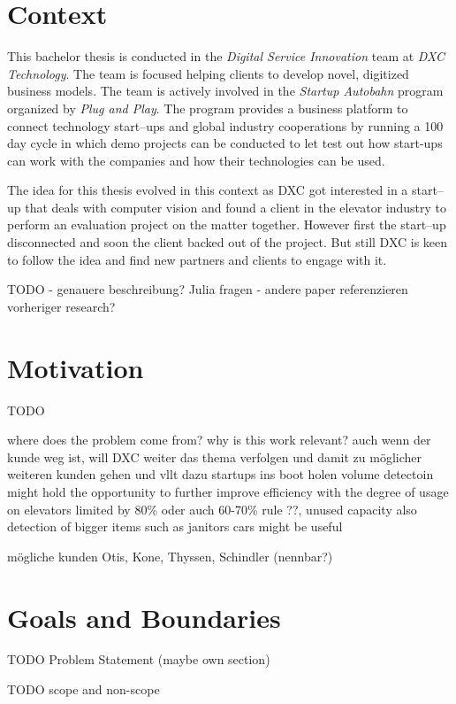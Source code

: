 \section{Context}

This bachelor thesis is conducted in the \emph{Digital Service Innovation} team at \emph{DXC Technology}.
The team is focused helping clients to develop novel, digitized business models.
The team is actively involved in the \emph{Startup Autobahn} program organized by \emph{Plug and Play}.
The program provides a business platform to connect technology start--ups and global industry cooperations 
by running a 100 day cycle in which demo projects can be conducted to let test out how start-ups can work with the companies and how their technologies can be used.

The idea for this thesis evolved in this context as DXC got interested in a start--up that deals with computer vision and found a client in the elevator industry to perform an evaluation project on the matter together.
However first the start--up disconnected and soon the client backed out of the project.
But still DXC is keen to follow the idea and find new partners and clients to engage with it.


TODO
- genauere beschreibung? Julia fragen
- andere paper referenzieren vorheriger research?


\section{Motivation}


TODO


where does the problem come from?
why is this work relevant?
auch wenn der kunde weg ist, will DXC weiter das thema verfolgen und damit zu möglicher weiteren kunden gehen und vllt dazu startups ins boot holen
volume detectoin might hold the opportunity to further improve efficiency with the degree of usage on elevators
limited by 80\% oder auch 60-70\% rule ??, unused capacity
also detection of bigger items such as janitors cars might be useful


mögliche kunden Otis, Kone, Thyssen, Schindler (nennbar?)

\section{Goals and Boundaries}

TODO Problem Statement (maybe own section)

TODO scope and non-scope

